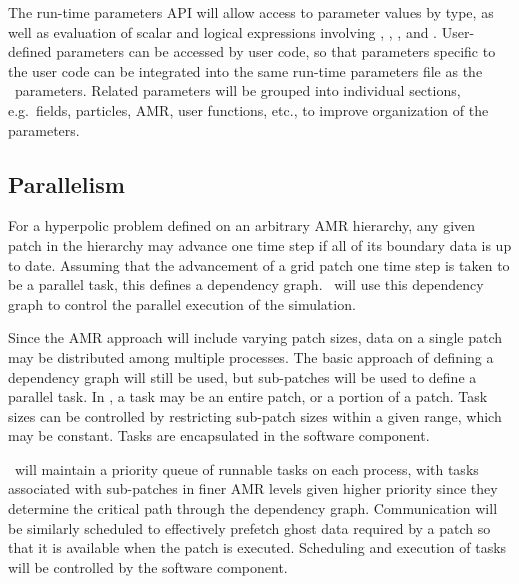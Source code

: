\documentclass[10pt]{article}
\begin{document}
The run-time parameters API will allow access to parameter values by
type, as well as evaluation of scalar and logical expressions
involving , , , and .  User-defined
parameters can be accessed by user code, so that parameters specific
to the user code can be integrated into the same run-time parameters
file as the \cello\ parameters.  Related parameters will be grouped
into individual sections, e.g.~fields, particles, AMR, user functions,
etc., to improve organization of the parameters.

\subsection{Parallelism} \label{ss:design-parallel}

For a hyperpolic problem defined on an arbitrary AMR hierarchy, any
given patch in the hierarchy may advance one time step if all of its
boundary data is up to date.  Assuming that the advancement of a grid
patch one time step is taken to be a parallel task, this defines a
dependency graph.  \cello\ will use this dependency graph to control
the parallel execution of the simulation.

Since the AMR approach will include varying patch sizes, data on a
single patch may be distributed among multiple processes.  The basic
approach of defining a dependency graph will still be used, but
sub-patches will be used to define a parallel task.  In \cello, a task
may be an entire patch, or a portion of a patch.  Task sizes can be
controlled by restricting sub-patch sizes within a given range, which
may be constant.  Tasks are encapsulated in the  software
component.

\cello\ will maintain a priority queue of runnable tasks on each
process, with tasks associated with sub-patches in finer AMR levels
given higher priority since they determine the critical path through
the dependency graph.  Communication will be similarly scheduled to
effectively prefetch ghost data required by a patch so that it is
available when the patch is executed.  Scheduling and execution of
tasks will be controlled by the  software component.
\end{document}
